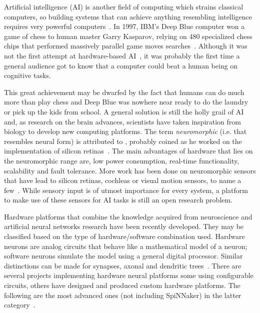 Artificial intelligence (AI) is another field of computing which strains classical computers, so building systems that can achieve anything resembling intelligence requires very powerful computers~\cite{to-build-a-brain-6247562}. In 1997, IBM's Deep Blue computer won a game of chess to human master Garry Kasparov, relying on 480 specialized chess chips that performed massively parallel game moves searches~\cite{deep-blue-Campbell200257}. Although it was not the first attempt at hardware-based AI~\cite{indiveri2011frontiers}, it was probably the first time a general audience got to know that a computer could beat a human being on cognitive tasks. 

This great achievement may be dwarfed by the fact that humans can do much more than play chess and Deep Blue was nowhere near ready to do the laundry or pick up the kids from school. A general solution is still the holly grail of AI and, as research on the brain advances, scientists have taken inspiration from biology to develop new computing platforms. 
The term \emph{neuromorphic} (i.e. that resembles neural form) is attributed to \citeauthor{mead2012analog}, probably coined as he worked on the implementation of silicon retinas~\cite{carver-mead,mead2012analog}. The main advantages of hardware that lies on the neuromorphic range are, low power consumption, real-time functionality, scalability and fault tolerance. More work has been done on neuromorphic sensors that have lead to silicon retinas, cochleas or visual motion sensors, to name a few~\cite{liu2010neuromorphic}. While sensory input is of utmost importance for every system, a platform to make use of these sensors for AI tasks is still an open research problem. 


Hardware platforms that combine the knowledge acquired from neuroscience and artificial neural networks research have been recently developed. They may be classified based on the type of hardware/software combination used. Hardware neurons are analog circuits that behave like a mathematical model of a neuron; software neurons simulate the model using a general digital processor. Similar distinctions can be made for synapses, axonal and dendritic trees~\cite{misra2010artificial}. There are several projects implementing hardware neural platforms some using configurable circuits, others have designed and produced custom hardware platforms. The following are the most advanced ones (not including SpiNNaker) in the latter category~\cite{neuro-platforms-summary-7159144}.

